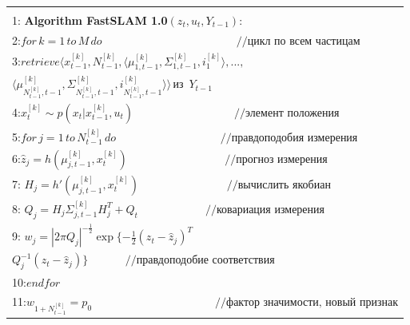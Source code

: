 \documentclass[10pt,a4paper]{article}
\begin{document}
\begin{table}[H]
\begin{center}
\begin{tabular}{|l|}
\hline
{}\\
1:\textbf{ Algorithm FastSLAM 1.0}$(z_t,u_t,Y_{t-1}):$\\
2:\hspace{5mm}$\textit{for}\,k=1\,\textit{to}\,M\,\textit{do}\qquad\qquad\qquad\qquad\qquad\qquad//\textit{цикл по всем частицам}$\\
3:\hspace{10mm}$\textit{retrieve}\langle x_{t-1}^{[k]},N_{t-1}^{[k]},\langle\mu_{1,t-1}^{[k]},\varSigma_{1,t-1}^{[k]},i_1^{[k]}\rangle,...,$\\
\hspace{30mm}$\langle\mu_{N_{t-1}^{[k]},t-1}^{[k]},\varSigma_{N_{t-1}^{[k]},t-1}^{[k]},i_{N_{t-1}^{[k]},t-1}^{[k]}\rangle\rangle\,\textit{из }\,Y_{t-1}$\\
4:\hspace{10mm}$x_t^{[k]}\sim p(x_t|x_{t-1}^{[k]},u_t)\qquad\qquad\quad\qquad\qquad//\textit{элемент положения}$\\
5:\hspace{10mm}$\textit{for}\,j=1\,\textit{to}\,N_{t-1}^{[k]}\,\textit{do}\,\,\qquad\qquad\qquad\qquad\quad//\textit{правдоподобия измерения}$\\
6:\hspace{13mm}$\hat{z}_j=h(\mu_{j,t-1}^{[k]},x_t^{[k]})\,\,\,\,\quad\quad\qquad\qquad\qquad//\textit{прогноз измерения}$\\
7:\hspace{12mm}
$H_j=h'(\mu_{j,t-1}^{[k]},x_t^{[k]})\,\,\,\,\,\qquad\qquad\qquad\quad//\textit{вычислить якобиан}$\\
8:\hspace{12mm}
$Q_j=H_j\varSigma_{j,t-1}^{[k]}H_j^T+Q_t\qquad\qquad\qquad//\textit{ковариация измерения}$\\
9:\hspace{12mm}
$w_j=|2\pi Q_j|^{-\frac{1}{2}}\exp\{-\frac{1}{2}(z_t-\hat{z}_j)^T$\\
\hspace{40mm}$Q_j^{-1}(z_t-\hat{z}_j)\}\,\,\quad\qquad//\textit{правдоподобие соответствия}$\\
10:\hspace{9mm}$\textit{endfor}$\\
11:\hspace{9mm}$w_{1+N_{t-1}^{[k]}}=p_0\qquad\qquad\qquad\qquad\quad\qquad//\textit{фактор значимости, новый признак}$\\

\end{tabular}
\end{center}
\end{table}
\end{document}

